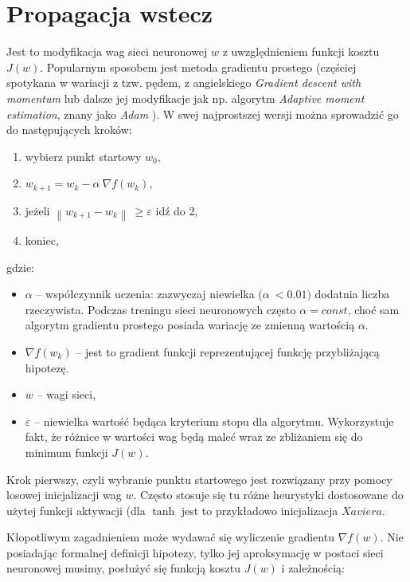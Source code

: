 \section{Propagacja wstecz}
\label{sec:backprob}

Jest to modyfikacja wag sieci neuronowej \(w\) z uwzględnieniem funkcji kosztu \(J(w)\). Popularnym sposobem jest metoda gradientu prostego \cite{gd} (częściej spotykana w wariacji z tzw. pędem, z angielskiego \textit{Gradient descent with momentum} lub dalsze jej modyfikacje jak np. algorytm
\textit{Adaptive moment estimation}, znany jako \textit{Adam} \cite{adampaper}). W swej najprostszej wersji można sprowadzić go do następujących kroków:

\begin{enumerate}
\def\labelenumi{\arabic{enumi}.}
\item
  wybierz punkt startowy \(w_{0}\),
\item
  \(w_{k + 1} = w_{k} - \alpha\ \nabla f(w_{k})\),
\item
  jeżeli \(\left\| w_{k + 1} - w_{k} \right\|\  \geq \varepsilon\) idź
  do 2,
\item
  koniec,
\end{enumerate}

gdzie:

\begin{itemize}
\item
  \(\alpha\) -- współczynnik uczenia: zazwyczaj niewielka
  (\(\alpha\  < 0.01)\) dodatnia liczba rzeczywista. Podczas treningu
  sieci neuronowych często \(\alpha = const\), choć sam algorytm
  gradientu prostego posiada wariację ze zmienną wartością \(\alpha\).
\item
  \(\nabla f(w_{k})\) -- jest to gradient funkcji reprezentującej
  funkcję przybliżającą hipotezę.
\item
  \(w\) -- wagi sieci,
\item
  \(\varepsilon\) -- niewielka wartość będąca kryterium stopu dla
  algorytmu. Wykorzystuje fakt, że różnice w wartości wag będą maleć
  wraz ze zbliżaniem się do minimum funkcji \(J(w)\).
\end{itemize}

Krok pierwszy, czyli wybranie punktu startowego jest rozwiązany przy pomocy losowej inicjalizacji wag \(w\). Często stosuje się tu różne heurystyki dostosowane do użytej funkcji aktywacji (dla \(\tanh\) jest to przykładowo inicjalizacja \(Xaviera\).

Kłopotliwym zagadnieniem może wydawać się wyliczenie gradientu \(\nabla f(w)\). Nie posiadając formalnej definicji hipotezy, tylko jej aproksymację w postaci sieci neuronowej musimy, posłużyć się funkcją kosztu \(J(w)\) i zależnością:

